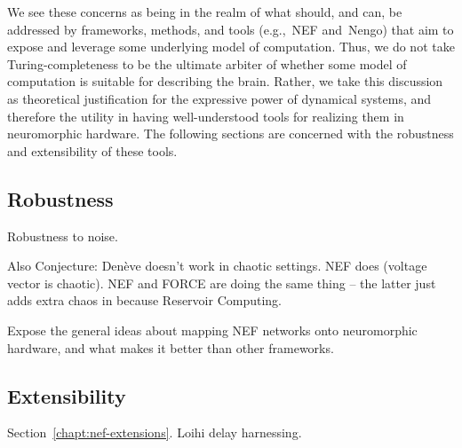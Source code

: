 We see these concerns as being in the realm of what should, and can, be addressed by frameworks, methods, and tools (e.g.,~NEF and~Nengo) that aim to expose and leverage some underlying model of computation.
Thus, we do not take Turing-completeness to be the ultimate arbiter of whether some model of computation is suitable for describing the brain.
Rather, we take this discussion as theoretical justification for the expressive power of dynamical systems, and therefore the utility in having well-understood tools for realizing them in neuromorphic hardware.
The following sections are concerned with the robustness and extensibility of these tools.

\subsection{Robustness}
\label{sec:nef-robustness}

Robustness to noise.

Also Conjecture: Den\`eve doesn't work in chaotic settings. NEF does (voltage vector is chaotic). NEF and FORCE are doing the same thing -- the latter just adds extra chaos in because Reservoir Computing.



Expose the general ideas about mapping NEF networks onto neuromorphic hardware, and what makes it better than other frameworks.


\subsection{Extensibility}
\label{sec:nef-extensibility}

Section~\ref{chapt:nef-extensions}. Loihi delay harnessing.
